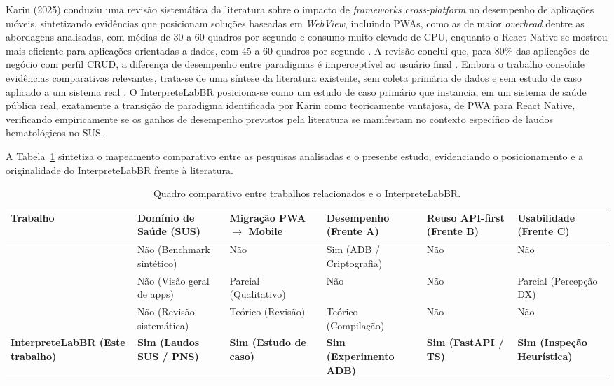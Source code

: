 \documentclass[12pt]{article}
\begin{document}
Karin (2025) conduziu uma revisão sistemática da literatura sobre o impacto de \emph{frameworks cross-platform} no desempenho de aplicações móveis, sintetizando evidências que posicionam soluções baseadas em \emph{WebView}, incluindo PWAs, como as de maior \emph{overhead} dentre as abordagens analisadas, com médias de 30 a 60 quadros por segundo e consumo muito elevado de CPU, enquanto o React Native se mostrou mais eficiente para aplicações orientadas a dados, com 45 a 60 quadros por segundo \cite{karin2025}. A revisão conclui que, para 80\% das aplicações de negócio com perfil CRUD, a diferença de desempenho entre paradigmas é imperceptível ao usuário final \cite{karin2025}. Embora o trabalho consolide evidências comparativas relevantes, trata-se de uma síntese da literatura existente, sem coleta primária de dados e sem estudo de caso aplicado a um sistema real \cite{karin2025}. O InterpreteLabBR posiciona-se como um estudo de caso primário que instancia, em um sistema de saúde pública real, exatamente a transição de paradigma identificada por Karin como teoricamente vantajosa, de PWA para React Native, verificando empiricamente se os ganhos de desempenho previstos pela literatura se manifestam no contexto específico de laudos hematológicos no SUS.

A Tabela~\ref{tab:trabalhos_relacionados} sintetiza o mapeamento comparativo entre as pesquisas analisadas e o presente estudo, evidenciando o posicionamento e a originalidade do InterpreteLabBR frente à literatura.

\begin{table}[H]
\centering
\caption{Quadro comparativo entre trabalhos relacionados e o InterpreteLabBR.}
\label{tab:trabalhos_relacionados}
\footnotesize
\setlength{\tabcolsep}{3.5pt}
\begin{tabular}{|p{2.8cm}|p{2.4cm}|p{2.2cm}|p{2.4cm}|p{2.2cm}|p{2.4cm}|}
\hline
\textbf{Trabalho} & \textbf{Domínio de Saúde (SUS)} & \textbf{Migração PWA $\rightarrow$ Mobile} & \textbf{Desempenho (Frente A)} & \textbf{Reuso API-first (Frente B)} & \textbf{Usabilidade (Frente C)} \\ \hline
\cite{sokolov2025} & Não (Benchmark sintético) & Não & Sim (ADB / Criptografia) & Não & Não \\ \hline
\cite{zhou2024} & Não (Visão geral de apps) & Parcial (Qualitativo) & Não & Não & Parcial (Percepção DX) \\ \hline
\cite{karin2025} & Não (Revisão sistemática) & Teórico (Revisão) & Teórico (Compilação) & Não & Não \\ \hline
\textbf{InterpreteLabBR (Este trabalho)} & \textbf{Sim (Laudos SUS / PNS)} & \textbf{Sim (Estudo de caso)} & \textbf{Sim (Experimento ADB)} & \textbf{Sim (FastAPI / TS)} & \textbf{Sim (Inspeção Heurística)} \\ \hline
\end{tabular}
\end{table}
\end{document}
